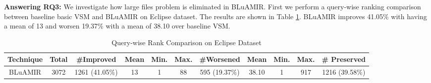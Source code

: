 \documentclass[conference]{IEEEtran}
\begin{document}
\textbf{Answering RQ3:} \label{answerRQ3}
We investigate how large files problem is eliminated in BLuAMIR. First we perform a query-wise ranking comparison between baseline basic VSM and BLuAMIR on Eclipse dataset. The results are shown in Table \ref{tab:Query-Rank}.
BLuAMIR improves 41.05\% with having a mean of 13 and worsen 19.37\% with a mean of 38.10 over baseline VSM. 

\begin{table}[htbp]
	\centering
	\caption{Query-wise Rank Comparison on Eclipse Dataset}
	\label{tab:Query-Rank}
	\begin{tabular}{c|c||c|c|c||c|c|c|c|c|c}
		\hline
		
		\textbf{Technique}
		& \textbf{Total}
		& \textbf{\#Improved}
		& \textbf{Mean}
		& \textbf{Min.} 
		& \textbf{Max.} & 
		\textbf{\#Worsened} &
		\textbf{Mean}  & 
		\textbf{Min.} &
		\textbf{Max.} &
		\textbf{\# Preserved}  \\
		\hline \hline
		BLuAMIR & 
		3072 &
		1261 (41.05\%) &
		13 &
		1 &
		88 &
		595 (19.37\%) &
		38.10 &
		1 &
		917 &
		1216 (39.58\%)\\
		\hline
	\end{tabular}
	\centering
\end{table}
\end{document}
